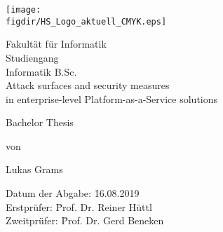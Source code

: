 \begin{titlepage}

\sffamily

\raggedleft

\vspace*{-2cm}

\texttt{[image: \\figdir/HS\_Logo\_aktuell\_CMYK.eps]}

\vfill

\centering
\Huge
Fakultät für Informatik  \vspace{0.5cm}\\
\Large
Studiengang \\
Informatik B.Sc. \\

\Huge
Attack surfaces and security measures \\
in enterprise-level Platform-as-a-Service solutions

\vspace{2cm}

\Large
Bachelor Thesis


\vspace{1.0cm}

\Large
von

\vspace{0.5cm}

\LARGE
Lukas Grams

\vspace{1cm}

\flushleft
 \Large
\vspace*{\fill}

\begin{tabbing}
Datum der Abgabe: \= 16.08.2019 \\ 
Erstprüfer: \= Prof. Dr. Reiner Hüttl \\
Zweitprüfer: \= Prof. Dr. Gerd Beneken \\
\end{tabbing}

\end{titlepage}


\cleardoubleemptypage

